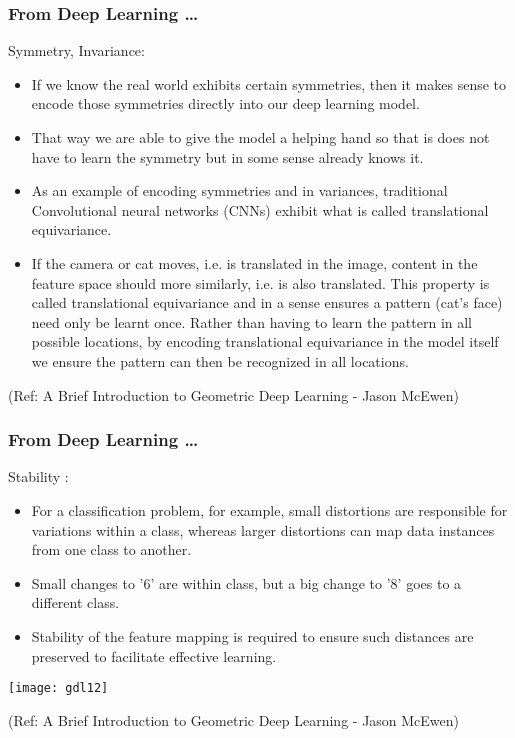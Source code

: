 \begin{frame}[fragile]\frametitle{From Deep Learning \ldots}

Symmetry, Invariance:

\begin{itemize}
\item If we know the real world exhibits certain symmetries, then it makes sense to encode those symmetries directly into our deep learning model.
\item That way we are able to give the model a helping hand so that is does not have to learn the symmetry but in some sense already knows it.
\item As an example of encoding symmetries and in variances, traditional Convolutional neural networks (CNNs) exhibit what is called translational equivariance.
\item If the camera or cat moves, i.e. is translated in the image, content in the feature space should more similarly, i.e. is also translated. This property is called translational equivariance and in a sense ensures a pattern (cat’s face) need only be learnt once. Rather than having to learn the pattern in all possible locations, by encoding translational equivariance in the model itself we ensure the pattern can then be recognized in all locations.
\end{itemize}

{\tiny (Ref: A Brief Introduction to Geometric Deep Learning - Jason McEwen)}

\end{frame}

\begin{frame}[fragile]\frametitle{From Deep Learning \ldots}

Stability :

\begin{itemize}
\item For a classification problem, for example, small distortions are responsible for variations within a class, whereas larger distortions can map data instances from one class to another. 
\item Small changes to '6' are within class, but a big change to '8' goes to a different class.
\item Stability of the feature mapping is required to ensure such distances are preserved to facilitate effective learning.
\end{itemize}

\begin{center}
\texttt{[image: gdl12]}
\end{center}

{\tiny (Ref: A Brief Introduction to Geometric Deep Learning - Jason McEwen)}

\end{frame}

